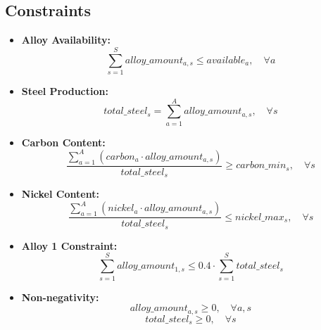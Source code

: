 \documentclass{article}
\begin{document}
\subsection*{Constraints}

\begin{itemize}
    \item \textbf{Alloy Availability:}
    \[
    \sum_{s=1}^{S} alloy\_amount_{a,s} \leq available_{a}, \quad \forall a
    \]
    
    \item \textbf{Steel Production:}
    \[
    total\_steel_{s} = \sum_{a=1}^{A} alloy\_amount_{a,s}, \quad \forall s
    \]
    
    \item \textbf{Carbon Content:}
    \[
    \frac{\sum_{a=1}^{A} (carbon_{a} \cdot alloy\_amount_{a,s})}{total\_steel_{s}} \geq carbon\_min_{s}, \quad \forall s
    \]
    
    \item \textbf{Nickel Content:}
    \[
    \frac{\sum_{a=1}^{A} (nickel_{a} \cdot alloy\_amount_{a,s})}{total\_steel_{s}} \leq nickel\_max_{s}, \quad \forall s
    \]
    
    \item \textbf{Alloy 1 Constraint:}
    \[
    \sum_{s=1}^{S} alloy\_amount_{1,s} \leq 0.4 \cdot \sum_{s=1}^{S} total\_steel_{s}
    \]
    
    \item \textbf{Non-negativity:}
    \[
    alloy\_amount_{a,s} \geq 0, \quad \forall a, s
    \]
    \[
    total\_steel_{s} \geq 0, \quad \forall s
    \]
\end{itemize}
\end{document}

